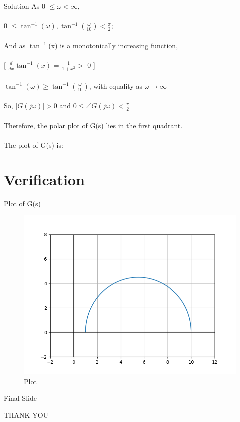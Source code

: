 \documentclass{beamer}
\begin{document}
\begin{frame}{Solution}
As 0 $\leq \omega < \infty$,\\~\\ 0 $\leq \tan^{-1}(\omega), \tan^{-1}(\frac{\omega}{10}) < \frac{\pi}{2}$;\\~\\
And as $\tan^{-1}$(x) is a monotonically increasing function,\\~\\

[ $\frac{d}{dx}\tan^{-1}(x)$ = $\frac{1}{1+x^2} >$  0  ]\\~\\
$\tan^{-1}(\omega) \geq \tan^{-1}(\frac{\omega}{10}) $, with equality as $\omega \rightarrow \infty$\\~\\
So, $|G(j\omega)| > 0 $ and $0 \leq \angle G(j\omega) < \frac{\pi}{2}$
\\~\\ Therefore, the polar plot of G(s) lies in the first quadrant. \\~\\ The plot of G(s) is:


\end{frame}

\section{Verification}


\begin{frame}{Plot of G(s)}
\begin{center}
      \begin{figure}[!h]
      \centering
      \includegraphics[width=\columnwidth]{./figs/ee18btech11051_fig2.png}
      \caption{Plot}
      \label{fig:ee18btech11051_fig2}
      \end{figure}
\end{center}

\end{frame}

\begin{frame}{Final Slide}
\begin{center}
    THANK YOU
\end{center}
    
\end{frame}
    
\end{document}
